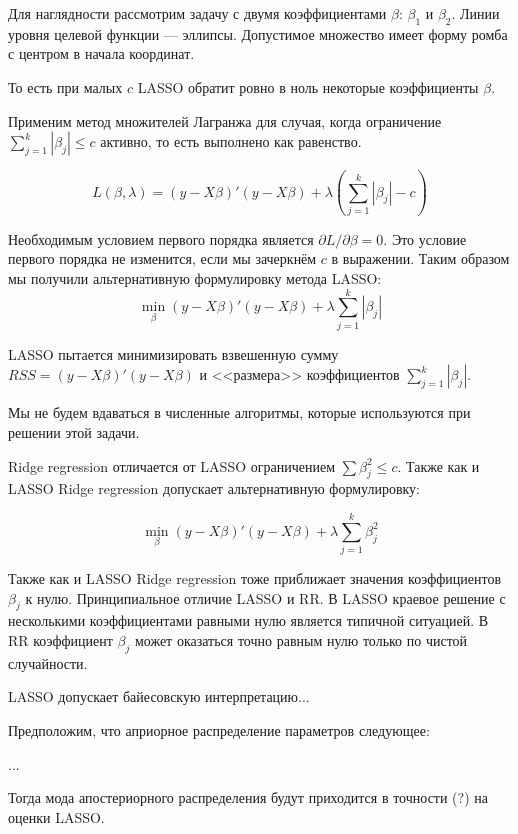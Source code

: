 \documentclass[pdftex,12pt,a4paper]{article}
\begin{document}
Для наглядности рассмотрим задачу с двумя коэффициентами $\beta$: $\beta_1$ и $\beta_2$. Линии уровня целевой функции --- эллипсы. Допустимое множество имеет форму ромба с центром в начала координат.




То есть при малых $c$ LASSO обратит ровно в ноль некоторые коэффициенты $\beta$.


Применим метод множителей Лагранжа для случая, когда ограничение $\sum_{j=1}^{k}|\beta_j|\leq c$ активно, то есть выполнено как равенство. 

\begin{equation}
L(\beta,\lambda)=(y-X\beta)'(y-X\beta)+\lambda \left(\sum_{j=1}^{k}|\beta_j| - c \right)
\end{equation}

Необходимым условием первого порядка является $\partial L/\partial \beta =0$. 
Это условие первого порядка не изменится, если мы зачеркнём $c$ в выражении. 
Таким образом мы получили альтернативную формулировку метода LASSO:
\begin{equation}
\min_{\beta} (y-X\beta)'(y-X\beta)+\lambda \sum_{j=1}^{k}|\beta_j|
\end{equation}

LASSO пытается минимизировать взвешенную сумму $RSS=(y-X\beta)'(y-X\beta)$ и <<размера>> коэффициентов $\sum_{j=1}^{k}|\beta_j|$.


Мы не будем вдаваться в численные алгоритмы, которые используются при решении этой задачи.


Ridge regression отличается от LASSO ограничением $\sum \beta_j^2\leq c$. 
Также как и LASSO Ridge regression допускает альтернативную формулировку:

\begin{equation}
\min_{\beta} (y-X\beta)'(y-X\beta)+\lambda \sum_{j=1}^{k} \beta_j^2
\end{equation}

Также как и LASSO Ridge regression тоже приближает значения коэффициентов $\beta_j$ к нулю. 
Принципиальное отличие LASSO и RR. 
В LASSO краевое решение с несколькими коэффициентами равными нулю является типичной ситуацией. 
В RR коэффициент $\beta_j$ может оказаться точно равным нулю только по чистой случайности. 


LASSO допускает байесовскую интерпретацию...

Предположим, что априорное распределение параметров следующее:

...


Тогда мода апостериорного распределения будут приходится в точности (?) на оценки LASSO.


\end{document}
